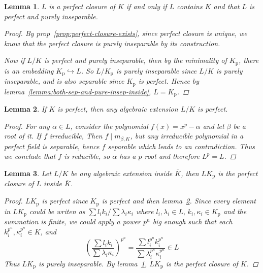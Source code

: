 \documentclass[a4paper]{article}
\theoremstyle{mystyle}
\newtheorem{lemma}{Lemma}
\theoremstyle{remark}
\theoremstyle{definition}
\theoremstyle{definition}
\begin{document}
  \begin{lemma} \label{lemma:perfect-closure-char}
    $L$ is a perfect closure of $K$ if and only if $L$ contains $K$ and that $L$ is perfect and
    purely inseparable.

    \begin{proof}
      By prop~\ref{prop:perfect-closure-exists}, since perfect closure is unique,
      we know that the perfect closure is purely inseparable by its construction.

      Now if $L/K$ is perfect and purely inseparable, then by the minimality of $K_\text{p}$,
      there is an embedding $K_\text{p} \hookrightarrow L$. So $L/K_\text{p}$ is purely inseparable
      since $L/K$ is purely inseparable, and is also separable since $K_\text{p}$ is perfect.
      Hence by lemma~\ref{lemma:both-sep-and-pure-insep-inside}, $L = K_\text{p}$.
    \end{proof}
  \end{lemma}

  \begin{lemma} \label{lemma:alg-ext-of-perfect-is-perfect}
    If $K$ is perfect, then any algebraic extension $L/K$ is perfect.

    \begin{proof}
      For any $\alpha \in L$, consider the polynomial $f(x) = x^p - \alpha$ and let $\beta$ be a
      root of it. If $f$ irreducible, Then $f \mid m_{\beta, K}$, but any irreducible polynomial in a perfect field
      is separable, hence $f$ separable which leads to an contradiction. Thus we conclude that $f$ is
      reducible, so $\alpha$ has a $p$ root and therefore $L^p = L$.
    \end{proof}
  \end{lemma}

  \begin{lemma} \label{lemma:perfect-closure-of-ext}
    Let $L/K$ be any algebraic extension inside $\overline{K}$, then $L K_\text{p}$ is
    the perfect closure of $L$ inside $\overline{K}$.

    \begin{proof}
      $L K_\text{p}$ is perfect since $K_\text{p}$ is perfect and then lemma~\ref{lemma:alg-ext-of-perfect-is-perfect}.
      Since every element in $L K_\text{p}$ could be writen as $\sum l_i k_i / \sum \lambda_i \kappa_i$ where
      $l_i, \lambda_i \in L, \, k_i, \kappa_i \in K_\text{p}$ and the summation is finite,
      we could apply a power $p^n$ big enough such that each $k_i^{p^n} , \kappa_i^{p^n} \in K$, and
      \[ \left( \frac{\sum l_i k_i}{\sum \lambda_i \kappa_i} \right)^{p^n} =
        \frac{\sum l_i^{p^n} k_i^{p^n}}{\sum \lambda_i^{p^n} \kappa_i^{p^n}} \in L \]
      Thus $L K_\text{p}$ is purely inseparable. By lemma~\ref{lemma:perfect-closure-char}, $L K_\text{p}$
      is the perfect closure of $K$.
    \end{proof}
  \end{lemma}
\end{document}
